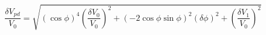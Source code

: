 \begin{equation}
\label{eq:delta_V_Malus}
\frac{\delta V_{pd}}{V_0} = \sqrt{ {\left(\cos{\phi}\right)}^4\left(\frac{\delta V_0}{V_0}\right)^2 + \left(-2 \cos{\phi}\sin{\phi} \right)^2(\delta \phi)^2+ \left(\frac{\delta V_1}{V_0}\right)^2}
\end{equation}